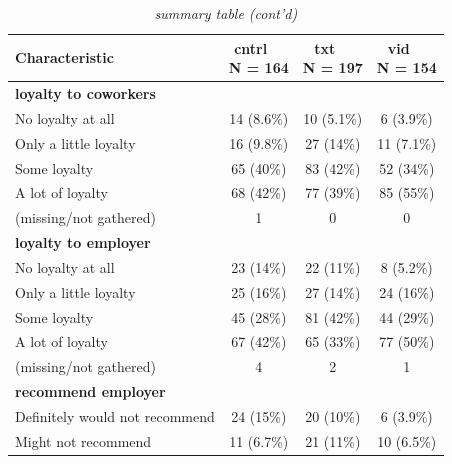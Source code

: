 \documentclass[
  11pt,
  oneside]{article}
\begin{document}
\begin{table}

\caption{\label{tab:tab-sum-uw}\textit{summary table (cont'd)}}
\centering
\begin{tabular}[t]{l|c|c|c}
\hline
\textbf{Characteristic} & \makecell[c]{\textbf{cntrl}\ \ \\N = 164} & \makecell[c]{\textbf{txt}\ \ \\N = 197} & \makecell[c]{\textbf{vid}\ \ \\N = 154}\\
\hline
\textbf{loyalty to coworkers} &  &  & \\
\hline
\hspace{1em}No loyalty at all & 14 (8.6\%) & 10 (5.1\%) & 6 (3.9\%)\\
\hline
\hspace{1em}Only a little loyalty & 16 (9.8\%) & 27 (14\%) & 11 (7.1\%)\\
\hline
\hspace{1em}Some loyalty & 65 (40\%) & 83 (42\%) & 52 (34\%)\\
\hline
\hspace{1em}A lot of loyalty & 68 (42\%) & 77 (39\%) & 85 (55\%)\\
\hline
\hspace{1em}(missing/not gathered) & 1 & 0 & 0\\
\hline
\textbf{loyalty to employer} &  &  & \\
\hline
\hspace{1em}No loyalty at all & 23 (14\%) & 22 (11\%) & 8 (5.2\%)\\
\hline
\hspace{1em}Only a little loyalty & 25 (16\%) & 27 (14\%) & 24 (16\%)\\
\hline
\hspace{1em}Some loyalty & 45 (28\%) & 81 (42\%) & 44 (29\%)\\
\hline
\hspace{1em}A lot of loyalty & 67 (42\%) & 65 (33\%) & 77 (50\%)\\
\hline
\hspace{1em}(missing/not gathered) & 4 & 2 & 1\\
\hline
\textbf{recommend employer} &  &  & \\
\hline
\hspace{1em}Definitely would not recommend & 24 (15\%) & 20 (10\%) & 6 (3.9\%)\\
\hline
\hspace{1em}Might not recommend & 11 (6.7\%) & 21 (11\%) & 10 (6.5\%)\\

\end{tabular}
\end{table}
\end{document}
